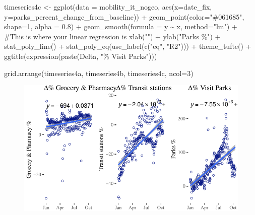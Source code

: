 \documentclass[
  letterpaper,
  DIV=11,
  numbers=noendperiod]{scrreprt}
\newenvironment{Shaded}{\begin{snugshade}}{\end{snugshade}}
\newcommand{\AttributeTok}[1]{\textcolor[rgb]{0.40,0.45,0.13}{#1}}
\newcommand{\CommentTok}[1]{\textcolor[rgb]{0.37,0.37,0.37}{#1}}
\newcommand{\DecValTok}[1]{\textcolor[rgb]{0.68,0.00,0.00}{#1}}
\newcommand{\FloatTok}[1]{\textcolor[rgb]{0.68,0.00,0.00}{#1}}
\newcommand{\FunctionTok}[1]{\textcolor[rgb]{0.28,0.35,0.67}{#1}}
\newcommand{\NormalTok}[1]{\textcolor[rgb]{0.00,0.23,0.31}{#1}}
\newcommand{\OtherTok}[1]{\textcolor[rgb]{0.00,0.23,0.31}{#1}}
\newcommand{\SpecialCharTok}[1]{\textcolor[rgb]{0.37,0.37,0.37}{#1}}
\newcommand{\StringTok}[1]{\textcolor[rgb]{0.13,0.47,0.30}{#1}}
\begin{document}
\begin{Shaded}
\begin{Highlighting}[]
\NormalTok{timeseries4c }\OtherTok{\textless{}{-}} \FunctionTok{ggplot}\NormalTok{(}\AttributeTok{data =}\NormalTok{ mobility\_it\_nogeo, }\FunctionTok{aes}\NormalTok{(}\AttributeTok{x=}\NormalTok{date\_fix, }\AttributeTok{y=}\NormalTok{parks\_percent\_change\_from\_baseline)) }\SpecialCharTok{+}
  \FunctionTok{geom\_point}\NormalTok{(}\AttributeTok{color=}\StringTok{"\#061685"}\NormalTok{, }\AttributeTok{shape=}\DecValTok{1}\NormalTok{, }\AttributeTok{alpha =} \FloatTok{0.8}\NormalTok{) }\SpecialCharTok{+}
  \FunctionTok{geom\_smooth}\NormalTok{(}\AttributeTok{formula =}\NormalTok{ y }\SpecialCharTok{\textasciitilde{}}\NormalTok{ x, }\AttributeTok{method=}\StringTok{"lm"}\NormalTok{) }\SpecialCharTok{+} \CommentTok{\#This is where your linear regression is}
  \FunctionTok{xlab}\NormalTok{(}\StringTok{""}\NormalTok{) }\SpecialCharTok{+}
  \FunctionTok{ylab}\NormalTok{(}\StringTok{"Parks \%"}\NormalTok{) }\SpecialCharTok{+}
  \FunctionTok{stat\_poly\_line}\NormalTok{() }\SpecialCharTok{+}
  \FunctionTok{stat\_poly\_eq}\NormalTok{(}\FunctionTok{use\_label}\NormalTok{(}\FunctionTok{c}\NormalTok{(}\StringTok{"eq"}\NormalTok{, }\StringTok{"R2"}\NormalTok{))) }\SpecialCharTok{+}
 \FunctionTok{theme\_tufte}\NormalTok{() }\SpecialCharTok{+}
  \FunctionTok{ggtitle}\NormalTok{(}\FunctionTok{expression}\NormalTok{(}\FunctionTok{paste}\NormalTok{(Delta, }\StringTok{"\% Visit Parks"}\NormalTok{)))}
  
  
\FunctionTok{grid.arrange}\NormalTok{(timeseries4a, timeseries4b, timeseries4c, }\AttributeTok{ncol=}\DecValTok{3}\NormalTok{)}
\end{Highlighting}
\end{Shaded}

\begin{figure}[H]

{\centering \includegraphics{longitudinal-1_files/figure-pdf/unnamed-chunk-13-1.pdf}

}

\end{figure}
\end{document}
